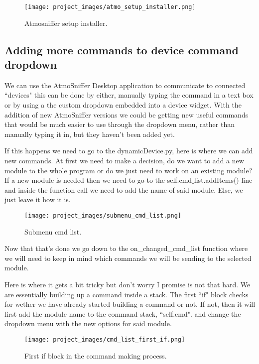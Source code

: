 \begin{figure}[H]
\centering
\texttt{[image: project\_images/atmo\_setup\_installer.png]}
 \caption{Atmosniffer setup installer.}
 \label{fig:atmo setup installer}
\end{figure}

\subsection{Adding more commands to device command dropdown}
	We can use the AtmoSniffer Desktop application to communicate to connected ``devices" this can be done by either, manually typing the command in a text box or by using a the custom dropdown embedded into a device widget. With the addition of new AtmoSniffer versions we could be getting new useful commands that would be much easier to use through the dropdown menu, rather than manually typing it in, but they haven't been added yet.

	If this happens we need to go to the dynamicDevice.py, here is where we can add new commands. At first we need to make a decision, do we want to add a new module to the whole program or do we just need to work on an existing module? If a new module is needed then we need to go to the self.cmd$\_$list.addItems() line and inside the function call we need to add the name of said module. Else, we just leave it how it is.

\begin{figure}[H]
\centering
\texttt{[image: project\_images/submenu\_cmd\_list.png]}
 \caption{Submenu cmd list.}
 \label{fig:submenu cmd listr}
\end{figure}

	Now that that's done we go down to the on\_changed\_cmd\_list function where we will need to keep in mind which commands we will be sending to the selected module.

	Here is where it gets a bit tricky but don't worry I promise is not that hard. We are essentially building up a command inside a stack. The first ``if" block checks for wether we have already started building a command or not. If not, then it will first add the module name to the command stack, ``self.cmd". and change the dropdown menu with the new options for said module.

\begin{figure}[H]
\centering
\texttt{[image: project\_images/cmd\_list\_first\_if.png]}
 \caption{First if block in the command making process.}
 \label{fig:cmd list first if}
\end{figure}

